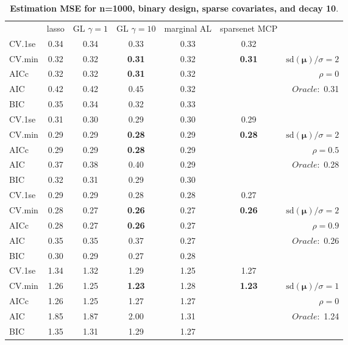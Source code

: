 \clearpage
\begin{table}\vspace{-.5cm}
\caption[l]{ { \bf Estimation MSE for n=1000, binary design, 
sparse covariates, and  decay  10}.}
\vspace{-.5cm}
\footnotesize{}
\begin{center}
\begin{tabular}{l*{5}{c}|r}
& lasso & GL $\gamma=1$ & GL $\gamma=10$ & marginal AL & sparsenet MCP  & \\
 \cline{1-7}
CV.1se & 0.34 & 0.34 & 0.33 & 0.33 & 0.32 & \\
CV.min & 0.32 & 0.32 & {\bf 0.31} & 0.32 & {\bf 0.31} &  $\mathrm{sd}(\mathbf{\mu})/\sigma=2$ \\
AICc & 0.32 & 0.32 & {\bf 0.31} & 0.32 & & $\rho=0$ \\
AIC & 0.42 & 0.42 & 0.45 & 0.32 & &  \multirow{2}{*}{$Oracle: $ 0.31} \\
BIC & 0.35 & 0.34 & 0.32 & 0.33 & &  \\
 \hline 
CV.1se & 0.31 & 0.30 & 0.29 & 0.30 & 0.29 & \\
CV.min & 0.29 & 0.29 & {\bf 0.28} & 0.29 & {\bf 0.28} &  $\mathrm{sd}(\mathbf{\mu})/\sigma=2$ \\
AICc & 0.29 & 0.29 & {\bf 0.28} & 0.29 & & $\rho=0.5$ \\
AIC & 0.37 & 0.38 & 0.40 & 0.29 & &  \multirow{2}{*}{$Oracle: $ 0.28} \\
BIC & 0.32 & 0.31 & 0.29 & 0.30 & &  \\
 \hline 
CV.1se & 0.29 & 0.29 & 0.28 & 0.28 & 0.27 & \\
CV.min & 0.28 & 0.27 & {\bf 0.26} & 0.27 & {\bf 0.26} &  $\mathrm{sd}(\mathbf{\mu})/\sigma=2$ \\
AICc & 0.28 & 0.27 & {\bf 0.26} & 0.27 & & $\rho=0.9$ \\
AIC & 0.35 & 0.35 & 0.37 & 0.27 & &  \multirow{2}{*}{$Oracle: $ 0.26} \\
BIC & 0.30 & 0.29 & 0.27 & 0.28 & &  \\
 \hline 
CV.1se & 1.34 & 1.32 & 1.29 & 1.25 & 1.27 & \\
CV.min & 1.26 & 1.25 & {\bf 1.23} & 1.28 & {\bf 1.23} &  $\mathrm{sd}(\mathbf{\mu})/\sigma=1$ \\
AICc & 1.26 & 1.25 & 1.27 & 1.27 & & $\rho=0$ \\
AIC & 1.85 & 1.87 & 2.00 & 1.31 & &  \multirow{2}{*}{$Oracle: $ 1.24} \\
BIC & 1.35 & 1.31 & 1.29 & 1.27 & &  \\

\end{tabular}
\end{center}
\end{table}
